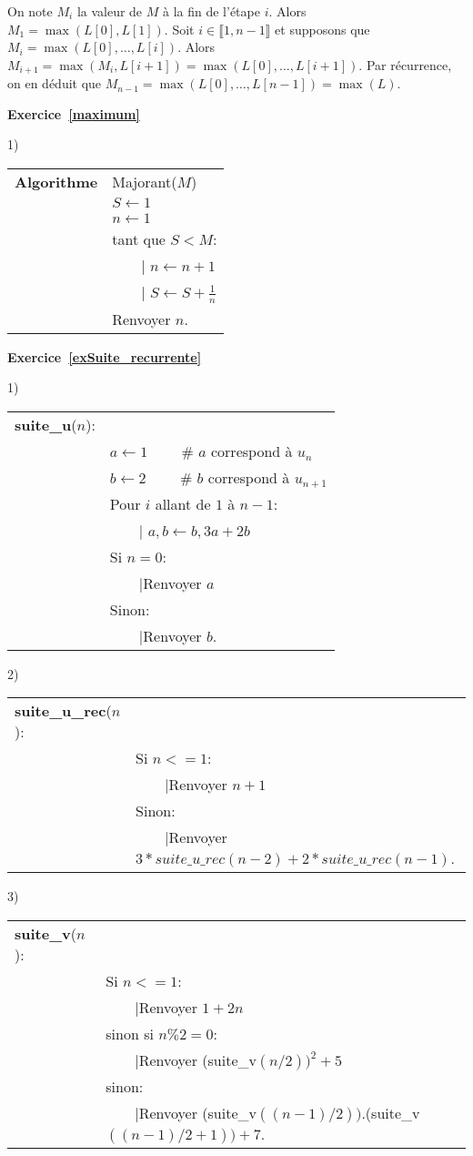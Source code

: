 \documentclass[11pt,a4paper]{article}
\begin{document}
On note $M_i$ la valeur de $M$ à la fin de  l'étape $i$. Alors $M_1=\max(L[0],L[1])$. Soit $i\in \llbracket 1,n-1\rrbracket$ et supposons que $M_i=\max(L[0],\ldots,L[i])$. Alors $M_{i+1}=\max(M_i,L[i+1])=\max(L[0],\ldots,L[i+1])$. Par récurrence, on en déduit que $M_{n-1}=\max(L[0],\ldots,L[n-1])=\max(L)$. 

\textbf{Exercice~\ref{maximum}}

1) \begin{tabular}{ll}
\textbf{Algorithme} &Majorant($M$) \\
& $S\leftarrow 1$\\
& $n\leftarrow 1$\\
& tant que $S < M$:\\
& \ \ \ {\ \rm |} $n\leftarrow n+1$\\
& \ \ \ {\ \rm |} $S\leftarrow S+\frac{1}{n}$\\

& Renvoyer $n$.
\end{tabular}



\textbf{Exercice~\ref{exSuite_recurrente}}

1) 

 \begin{tabular}{ll}
\textbf{suite\_u}($n$):\\
& $a\leftarrow 1$ \ \ \ \ \# $a$ correspond à $u_n$ \\ 
& $b\leftarrow 2$ \ \ \ \ \# $b$ correspond à $u_{n+1}$ \\
& Pour $i$ allant  de $1$ à $n-1$: \\
&\ \ \ {\ \rm |} $a,b\leftarrow b,3a+2b$\\
& Si $n=0$:\\
&\ \ \ {\ \rm |}Renvoyer $a$\\
& Sinon: \\
&\ \ \ {\ \rm |}Renvoyer $b$.
\end{tabular}

2) 

 \begin{tabular}{ll}
\textbf{suite\_u\_rec}($n$):\\

& Si $n<=1$:\\
&\ \ \ {\ \rm |}Renvoyer $n+1$\\
& Sinon: \\
&\ \ \ {\ \rm |}Renvoyer $3*suite\_u\_rec(n-2)+2*suite\_u\_rec(n-1)$.
\end{tabular}

3) \begin{tabular}{ll}
\textbf{suite\_v}($n$):\\

& Si $n<=1$:\\
&\ \ \ {\ \rm |}Renvoyer $1+2n$\\
& sinon si $n\%2=0$:\\
&\ \ \ {\ \rm |}Renvoyer (suite\_v$(n/2))^2+5$\\
& sinon:\\
&\ \ \ {\ \rm |}Renvoyer (suite\_v$((n-1)/2))$.(suite\_v$((n-1)/2+1))+7$.\\
\end{tabular}
\end{document}
